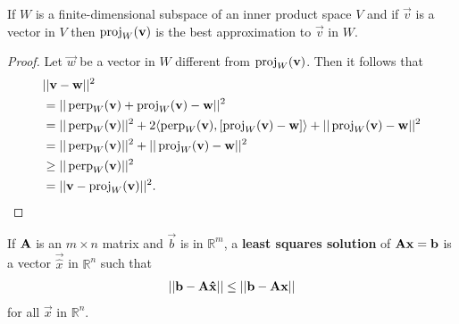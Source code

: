 \documentclass{memoir}
\begin{document}
\begin{theorem}
    If $W$ is a finite-dimensional subspace of an inner product space $V$ and if $\vec{v}$ is a vector in $V$ then $\proj_W(\vec{v})$ is the best approximation to $\vec{v}$ in $W$.
\end{theorem}
\begin{proof}
    Let $\vec{w}$ be a vector in $W$ different from $\proj_W(\vec{v})$. Then it follows that
    \begin{align*}
        &||\vec{v} - \vec{w}||^2 \\
        &= ||\Perp_W(\vec{v}) + \proj_W(\vec{v}) - \vec{w}||^2 \\
        &= ||\Perp_W(\vec{v})||^2 + 2\langle \Perp_W(\vec{v}), [\proj_W(\vec{v}) - \vec{w}]\rangle + ||\proj_W(\vec{v}) - \vec{w}||^2 \\
        &=||\Perp_W(\vec{v})||^2 + ||\proj_W(\vec{v}) - \vec{w}||^2 \\
        &\ge ||\Perp_W(\vec{v})||^2 \\
        &= ||\vec{v} - \proj_W(\vec{v})||^2.
    \end{align*}
\end{proof}

\begin{definition}
    If $\mat{A}$ is an $m \times n$ matrix and $\vec{b}$ is in $\mathbb{R}^m$, a \textbf{least squares solution} of $\mat{A} \vec{x} = \vec{b}$ is a vector $\vec{\hat{x}}$ in $\mathbb{R}^n$ such that
    \begin{align*}
        ||\vec{b} - \mat{A} \vec{\hat{x}}|| \le ||\vec{b} - \mat{A} \vec{x}||
    \end{align*}
    for all $\vec{x}$ in $\mathbb{R}^n$.
\end{definition}
\end{document}
